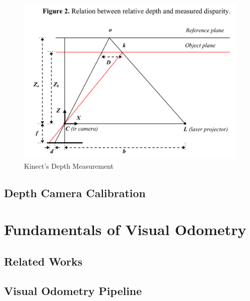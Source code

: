 \documentclass[a4paper]{report}
\numberwithin{figure}{section}
\begin{document}
\begin{figure}[H]
	\centering
  \includegraphics[width=0.7\linewidth,natwidth=640,natheight=640]
  {fig/ref_imgs/kinect_depth_measurement.png}
  \caption{Kinect's Depth Measurement}
	\label{fig:uncertainty_matching}
\end{figure}

\section{Depth Camera Calibration} \label{sc_depth_camera_calibration}

\chapter{Fundamentals of Visual Odometry} \label{cp_vo}

\section{Related Works} \label{sc_visual_odometry_related_works}



\section{Visual Odometry Pipeline} \label{sc_visual_odometry_pipeline}
\end{document}
